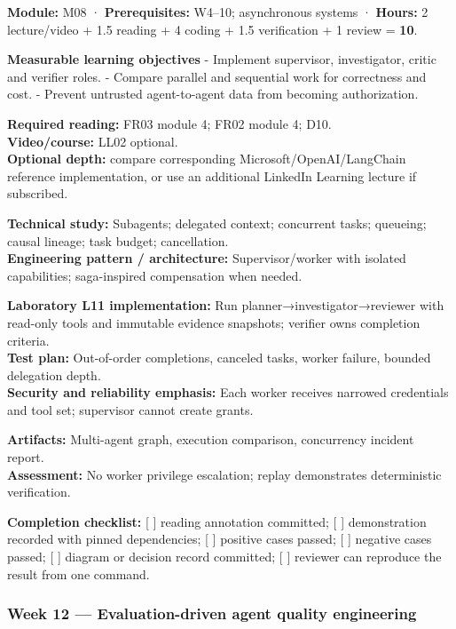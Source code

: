\documentclass[
  10pt,
]{article}
\begin{document}
\textbf{Module:} M08 · \textbf{Prerequisites:} W4--10; asynchronous
systems · \textbf{Hours:} 2 lecture/video + 1.5 reading + 4 coding + 1.5
verification + 1 review = \textbf{10}.

\textbf{Measurable learning objectives} - Implement supervisor,
investigator, critic and verifier roles. - Compare parallel and
sequential work for correctness and cost. - Prevent untrusted
agent-to-agent data from becoming authorization.

\textbf{Required reading:} FR03 module 4; FR02 module 4; D10.\\
\textbf{Video/course:} LL02 optional.\\
\textbf{Optional depth:} compare corresponding
Microsoft/OpenAI/LangChain reference implementation, or use an
additional LinkedIn Learning lecture if subscribed.

\textbf{Technical study:} Subagents; delegated context; concurrent
tasks; queueing; causal lineage; task budget; cancellation.\\
\textbf{Engineering pattern / architecture:} Supervisor/worker with
isolated capabilities; saga-inspired compensation when needed.

\textbf{Laboratory L11 implementation:} Run
planner→investigator→reviewer with read-only tools and immutable
evidence snapshots; verifier owns completion criteria.\\
\textbf{Test plan:} Out-of-order completions, canceled tasks, worker
failure, bounded delegation depth.\\
\textbf{Security and reliability emphasis:} Each worker receives
narrowed credentials and tool set; supervisor cannot create grants.

\textbf{Artifacts:} Multi-agent graph, execution comparison, concurrency
incident report.\\
\textbf{Assessment:} No worker privilege escalation; replay demonstrates
deterministic verification.

\textbf{Completion checklist:} {[} {]} reading annotation committed; {[}
{]} demonstration recorded with pinned dependencies; {[} {]} positive
cases passed; {[} {]} negative cases passed; {[} {]} diagram or decision
record committed; {[} {]} reviewer can reproduce the result from one
command.

\subsubsection{Week 12 --- Evaluation-driven agent quality
engineering}\label{week-12-evaluation-driven-agent-quality-engineering}
\end{document}
